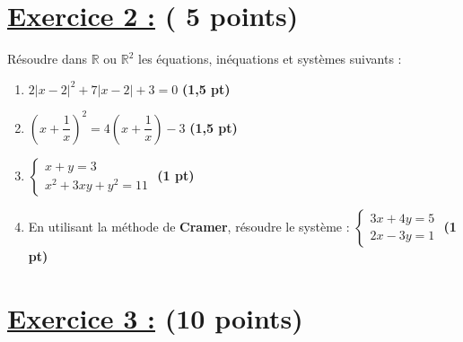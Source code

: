\documentclass[12pt,a4paper]{article}
\begin{document}
\section*{\underline{Exercice 2 :} ( 5 points) }

Résoudre dans $\mathbb{R}$ ou $\mathbb{R}^{2}$ les équations, inéquations et systèmes suivants :

\begin{enumerate}
    \item $2|x - 2|^2 + 7|x - 2| + 3 = 0$ \hfill \textbf{(1,5 pt)}
    
    \item $\left(x + \dfrac{1}{x}\right)^2 = 4\left(x + \dfrac{1}{x}\right) - 3$ \hfill \textbf{(1,5 pt)}
    
    \item $\begin{cases} x + y = 3 \\ x^2 + 3xy + y^2 = 11 \end{cases}$ \hfill \textbf{(1 pt)}
    
    \item En utilisant la méthode de \textbf{Cramer}, résoudre le système : 
    $\begin{cases} 3x + 4y = 5 \\ 2x - 3y = 1 \end{cases}$ \hfill \textbf{(1 pt)}
\end{enumerate}

\newpage
\section*{\underline{Exercice 3 :} (10 points) }
\end{document}
